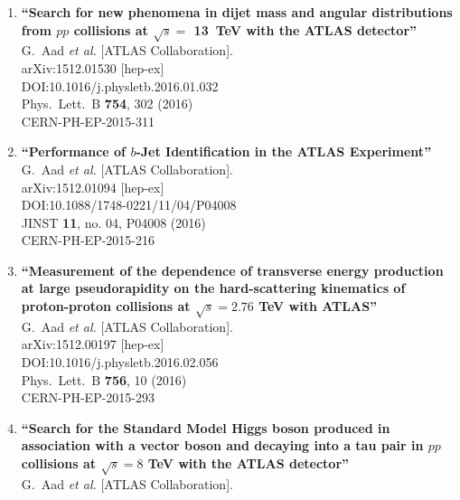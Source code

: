 \documentclass{article}
\begin{document}
\begin{enumerate}
\item%
{\bf ``Search for new phenomena in dijet mass and angular distributions from $pp$ collisions at $\sqrt{s}=$ 13 TeV with the ATLAS detector''}
  \\{}G.~Aad {\it et al.} [ATLAS Collaboration].
  \\{}arXiv:1512.01530 [hep-ex]
  \\{}DOI:10.1016/j.physletb.2016.01.032
  \\{}Phys.\ Lett.\ B {\bf 754}, 302 (2016)
  \\{}CERN-PH-EP-2015-311
\item%
{\bf ``Performance of $b$-Jet Identification in the ATLAS Experiment''}
  \\{}G.~Aad {\it et al.} [ATLAS Collaboration].
  \\{}arXiv:1512.01094 [hep-ex]
  \\{}DOI:10.1088/1748-0221/11/04/P04008
  \\{}JINST {\bf 11}, no. 04, P04008 (2016)
  \\{}CERN-PH-EP-2015-216
\item%
{\bf ``Measurement of the dependence of transverse energy production at large pseudorapidity on the hard-scattering kinematics of proton-proton collisions at $\sqrt{s} = 2.76$ TeV with ATLAS''}
  \\{}G.~Aad {\it et al.} [ATLAS Collaboration].
  \\{}arXiv:1512.00197 [hep-ex]
  \\{}DOI:10.1016/j.physletb.2016.02.056
  \\{}Phys.\ Lett.\ B {\bf 756}, 10 (2016)
  \\{}CERN-PH-EP-2015-293
\item%
{\bf ``Search for the Standard Model Higgs boson produced in association with a vector boson and decaying into a tau pair in $pp$ collisions at $\sqrt{s} = 8$ TeV with the ATLAS detector''}
  \\{}G.~Aad {\it et al.} [ATLAS Collaboration].

\end{enumerate}
\end{document}
